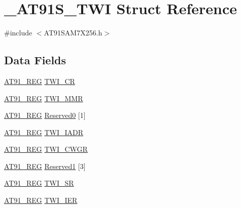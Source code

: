 \hypertarget{struct__AT91S__TWI}{\section{\-\_\-\-A\-T91\-S\-\_\-\-T\-W\-I Struct Reference}
\label{struct__AT91S__TWI}
}


{\ttfamily \#include $<$A\-T91\-S\-A\-M7\-X256.\-h$>$}

\subsection*{Data Fields}
\begin{DoxyCompactItemize}
\item 
\hyperlink{GCC_2ARM7__AT91SAM7S_2AT91SAM7X256_8h_a712ad5a1ac1bd02f3e95a7526c283ce1}{A\-T91\-\_\-\-R\-E\-G} \hyperlink{struct__AT91S__TWI_a68ae373546de5c57bbe5b31f8a99bb83}{T\-W\-I\-\_\-\-C\-R}
\item 
\hyperlink{GCC_2ARM7__AT91SAM7S_2AT91SAM7X256_8h_a712ad5a1ac1bd02f3e95a7526c283ce1}{A\-T91\-\_\-\-R\-E\-G} \hyperlink{struct__AT91S__TWI_a6db63eb6f9c1504221a2d53fcfc14fa2}{T\-W\-I\-\_\-\-M\-M\-R}
\item 
\hyperlink{GCC_2ARM7__AT91SAM7S_2AT91SAM7X256_8h_a712ad5a1ac1bd02f3e95a7526c283ce1}{A\-T91\-\_\-\-R\-E\-G} \hyperlink{struct__AT91S__TWI_a4d9b9a25483c9b95c55027ddc4717773}{Reserved0} \mbox{[}1\mbox{]}
\item 
\hyperlink{GCC_2ARM7__AT91SAM7S_2AT91SAM7X256_8h_a712ad5a1ac1bd02f3e95a7526c283ce1}{A\-T91\-\_\-\-R\-E\-G} \hyperlink{struct__AT91S__TWI_a3f3a383a5af5c0482890f65bb5cc53ce}{T\-W\-I\-\_\-\-I\-A\-D\-R}
\item 
\hyperlink{GCC_2ARM7__AT91SAM7S_2AT91SAM7X256_8h_a712ad5a1ac1bd02f3e95a7526c283ce1}{A\-T91\-\_\-\-R\-E\-G} \hyperlink{struct__AT91S__TWI_a7823e072ae96b5ab5e6c924c0be71365}{T\-W\-I\-\_\-\-C\-W\-G\-R}
\item 
\hyperlink{GCC_2ARM7__AT91SAM7S_2AT91SAM7X256_8h_a712ad5a1ac1bd02f3e95a7526c283ce1}{A\-T91\-\_\-\-R\-E\-G} \hyperlink{struct__AT91S__TWI_a9595ca6a765b0a41c421ae38eff5a802}{Reserved1} \mbox{[}3\mbox{]}
\item 
\hyperlink{GCC_2ARM7__AT91SAM7S_2AT91SAM7X256_8h_a712ad5a1ac1bd02f3e95a7526c283ce1}{A\-T91\-\_\-\-R\-E\-G} \hyperlink{struct__AT91S__TWI_aea550a0b52e5da6d7a3ad259dbf90e01}{T\-W\-I\-\_\-\-S\-R}
\item 
\hyperlink{GCC_2ARM7__AT91SAM7S_2AT91SAM7X256_8h_a712ad5a1ac1bd02f3e95a7526c283ce1}{A\-T91\-\_\-\-R\-E\-G} \hyperlink{struct__AT91S__TWI_adc26e9e1b308d02d99ee0fd5fdb152ac}{T\-W\-I\-\_\-\-I\-E\-R}

\end{DoxyCompactItemize}
